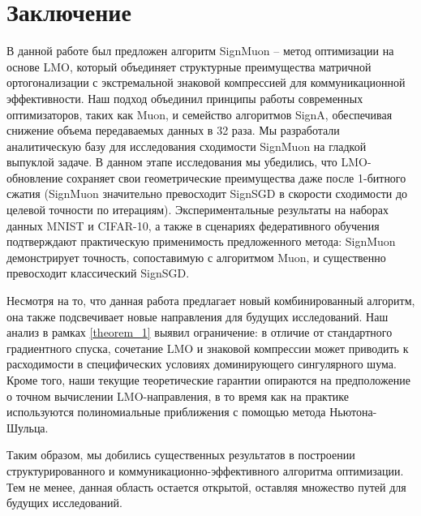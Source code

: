 \documentclass{article}
\begin{document}
\section{Заключение}
В данной работе был предложен алгоритм SignMuon -- метод оптимизации на основе LMO, который объединяет структурные преимущества матричной ортогонализации с экстремальной знаковой компрессией для коммуникационной эффективности. Наш подход объединил принципы работы современных оптимизаторов, таких как Muon, и семейство алгоритмов SignA, обеспечивая снижение объема передаваемых данных в 32 раза. Мы разработали аналитическую базу для исследования сходимости SignMuon на гладкой выпуклой задаче. В данном этапе исследования мы убедились, что LMO-обновление сохраняет свои геометрические преимущества даже после 1-битного сжатия (SignMuon значительно превосходит SignSGD в скорости сходимости до целевой точности по итерациям). Экспериментальные результаты на наборах данных MNIST и CIFAR-10, а также в сценариях федеративного обучения подтверждают практическую применимость предложенного метода: SignMuon демонстрирует точность, сопоставимую с алгоритмом Muon, и существенно превосходит классический SignSGD.

Несмотря на то, что данная работа предлагает новый комбинированный алгоритм, она также подсвечивает новые направления для будущих исследований. Наш анализ в рамках \cref{theorem_1} выявил ограничение: в отличие от стандартного градиентного спуска, сочетание LMO и знаковой компрессии может приводить к расходимости в специфических условиях доминирующего сингулярного шума. Кроме того, наши текущие теоретические гарантии опираются на предположение о точном вычислении LMO-направления, в то время как на практике используются полиномиальные приближения с помощью метода Ньютона-Шульца. 

Таким образом, мы добились существенных результатов в построении структурированного и коммуникационно-эффективного алгоритма оптимизации. Тем не менее, данная область остается открытой, оставляя множество путей для будущих исследований.


\newpage




\newpage
\appendix
\end{document}
